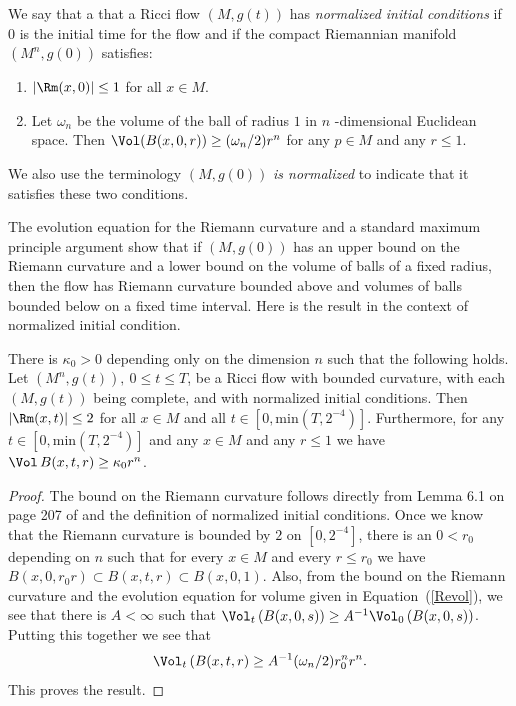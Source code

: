 \begin{definition}
\label{def:normalized-initial-conditions}
\label{norminitcond}
We say that a that a Ricci flow $(M,g(t))$ has {\em normalized
initial conditions}
if $0$ is the initial time for the flow and if the compact
Riemannian manifold $(M^n,g(0))$ satisfies:
\begin{enumerate}
\item $|\Rm(x,0)|\le 1$ for all $x\in M$.
\item Let $\omega_n$ be the volume of the ball of radius $1$ in $n$ -dimensional Euclidean
space. Then $\Vol(B(x,0,r))\ge (\omega_n/2)r^n$ for any $p\in
M$ and any $r\le 1$.
\end{enumerate}
We also use the terminology $(M,g(0))$ {\em is normalized} to
indicate that it satisfies these two conditions.
\end{definition}

The evolution equation for the Riemann curvature and a standard maximum
principle argument show that if $(M,g(0))$ has an upper bound on the Riemann
curvature and a lower bound on the volume of balls of a fixed radius, then the
flow has Riemann curvature bounded above and volumes of balls bounded below on
a fixed time interval. Here is the result in the context of normalized initial
condition.



\begin{proposition}
\label{prop:normalized-flow-short-time-bounds}
\label{kappa0r0t0}
 There is $\kappa_0>0$  depending only on the dimension $n$
 such that the following holds.
Let $(M^n,g(t)),\ 0\le t\le T$, be a Ricci flow with bounded curvature, with
each $(M,g(t))$ being complete, and with normalized initial conditions. Then
$|\Rm(x,t)|\le 2$ for all $x\in M$ and all $t\in [0,\mathrm{min}(T,2^{-4})]$.
Furthermore, for any $t\in [0,\mathrm{min}(T,2^{-4})]$ and any $x\in M$ and any
$r\le 1$ we have $\Vol\,B(x,t,r)\ge \kappa_0r^n$.
\end{proposition}

\begin{proof}
The bound on the Riemann curvature follows directly from Lemma 6.1
on page 207 of \cite{ChowLuNi} and the definition of normalized
initial conditions. Once we know that the Riemann curvature is
bounded by $2$ on $[0,2^{-4}]$, there is an $0<r_0$ depending on $n$
such that for every $x\in M$ and every $r\le r_0$ we have
$B(x,0,r_0r)\subset B(x,t,r)\subset B(x,0,1)$. Also, from the bound
on the Riemann curvature and the evolution equation for volume given
in Equation~(\ref{Revol}), we see that there is $A<\infty$ such that
$\Vol_t\,(B(x,0,s))\ge A^{-1}\Vol_0\,(B(x,0,s))$. Putting
this together we see that
$$\Vol_t\,(B(x,t,r)\ge A^{-1}(\omega_n/2)r_0^nr^n.$$
This proves the result.
\end{proof}



